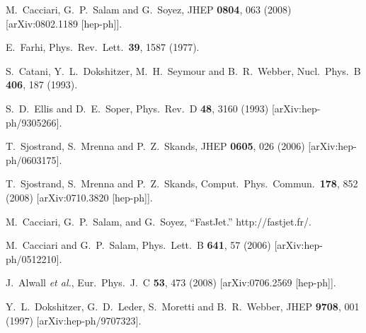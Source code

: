 \documentclass{JHEP3}
\begin{document}
\begin{thebibliography}{99}
  M.~Cacciari, G.~P.~Salam and G.~Soyez,
  JHEP {\bf 0804}, 063 (2008)
  [arXiv:0802.1189 [hep-ph]].



  E.~Farhi,
  Phys.\ Rev.\ Lett.\  {\bf 39}, 1587 (1977).

  S.~Catani, Y.~L.~Dokshitzer, M.~H.~Seymour and B.~R.~Webber,
  Nucl.\ Phys.\  B {\bf 406}, 187 (1993).

  S.~D.~Ellis and D.~E.~Soper,
  Phys.\ Rev.\  D {\bf 48}, 3160 (1993)
  [arXiv:hep-ph/9305266].

  T.~Sjostrand, S.~Mrenna and P.~Z.~Skands,
  JHEP {\bf 0605}, 026 (2006)
  [arXiv:hep-ph/0603175].


  T.~Sjostrand, S.~Mrenna and P.~Z.~Skands,
  Comput.\ Phys.\ Commun.\  {\bf 178}, 852 (2008)
  [arXiv:0710.3820 [hep-ph]].

  M.~Cacciari, G.~P.~Salam, and G.~Soyez, ``FastJet.''  http://fastjet.fr/.

  M.~Cacciari and G.~P.~Salam,
  Phys.\ Lett.\  B {\bf 641}, 57 (2006)
  [arXiv:hep-ph/0512210].

  J.~Alwall {\it et al.},
  Eur.\ Phys.\ J.\  C {\bf 53}, 473 (2008)
  [arXiv:0706.2569 [hep-ph]].

  Y.~L.~Dokshitzer, G.~D.~Leder, S.~Moretti and B.~R.~Webber,
  JHEP {\bf 9708}, 001 (1997)
  [arXiv:hep-ph/9707323].



\end{thebibliography}
\end{document}
